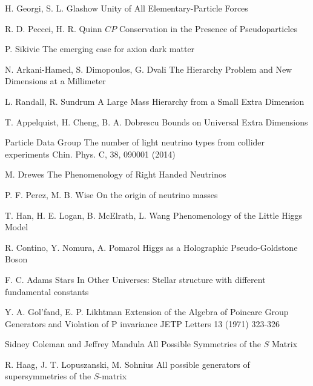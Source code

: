 {H. Georgi, S. L. Glashow}
{Unity of All Elementary-Particle Forces}
{}

{R. D. Peccei, H. R. Quinn}
{$CP$ Conservation in the Presence of Pseudoparticles}
{}

{P. Sikivie}
{The emerging case for axion dark matter}
{}

{N. Arkani-Hamed, S. Dimopoulos, G. Dvali}
{The Hierarchy Problem and New Dimensions at a Millimeter}
{}

{L. Randall, R. Sundrum}
{A Large Mass Hierarchy from a Small Extra Dimension}
{}

{T. Appelquist, H. Cheng, B. A. Dobrescu}
{Bounds on Universal Extra Dimensions}
{}

{Particle Data Group}
{The number of light neutrino types from collider experiments}
{Chin. Phys. C, 38, 090001 (2014)}

{M. Drewes}
{The Phenomenology of Right Handed Neutrinos}
{}

{P. F. Perez, M. B. Wise}
{On the origin of neutrino masses}
{}

{T. Han, H. E. Logan, B. McElrath, L. Wang}
{Phenomenology of the Little Higgs Model}
{}

{R. Contino, Y. Nomura, A. Pomarol}
{Higgs as a Holographic Pseudo-Goldstone Boson}
{}

{F. C. Adams}
{Stars In Other Universes: Stellar structure with
different fundamental constants}
{}

{Y. A. Gol'fand, E. P. Likhtman}
{Extension of the Algebra of Poincare Group Generators and Violation of P invariance}
{JETP Letters 13 (1971) 323-326}

{Sidney Coleman and Jeffrey Mandula}
{All Possible Symmetries of the $S$ Matrix}
{}

{R. Haag, J. T. Lopuszanski, M. Sohnius}
{All possible generators of supersymmetries of the $S$-matrix}
{}

